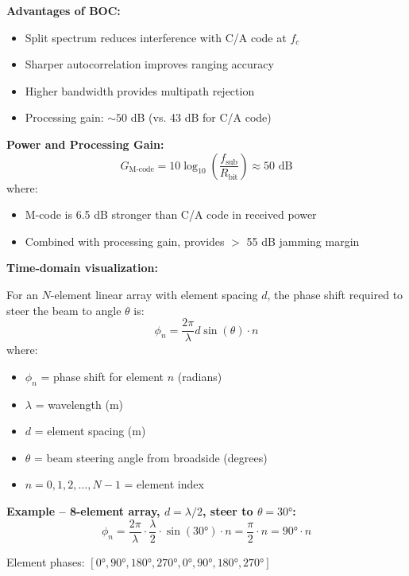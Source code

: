 \textbf{Advantages of BOC:}
\begin{itemize}
\item Split spectrum reduces interference with C/A code at $f_c$
\item Sharper autocorrelation improves ranging accuracy
\item Higher bandwidth provides multipath rejection
\item Processing gain: $\sim 50$ dB (vs. 43 dB for C/A code)
\end{itemize}

\textbf{Power and Processing Gain:}
\begin{equation}
G_{\text{M-code}} = 10\log_{10}\left(\frac{f_{\text{sub}}}{R_{\text{bit}}}\right) \approx 50 \text{ dB}
\end{equation}
where:
\begin{itemize}
\item M-code is 6.5 dB stronger than C/A code in received power
\item Combined with processing gain, provides $>$ 55 dB jamming margin
\end{itemize}

\textbf{Time-domain visualization:}

For an $N$-element linear array with element spacing $d$, the phase shift required to steer the beam to angle $\theta$ is:
\begin{equation}
\phi_n = \frac{2\pi}{\lambda} d \sin(\theta) \cdot n
\end{equation}
where:
\begin{itemize}
\item $\phi_n$ = phase shift for element $n$ (radians)
\item $\lambda$ = wavelength (m)
\item $d$ = element spacing (m)
\item $\theta$ = beam steering angle from broadside (degrees)
\item $n = 0, 1, 2, \ldots, N-1$ = element index
\end{itemize}

\textbf{Example -- 8-element array, $d = \lambda/2$, steer to $\theta = 30°$:}
\begin{equation}
\phi_n = \frac{2\pi}{\lambda} \cdot \frac{\lambda}{2} \cdot \sin(30°) \cdot n = \frac{\pi}{2} \cdot n = 90° \cdot n
\end{equation}

Element phases: $[0°, 90°, 180°, 270°, 0°, 90°, 180°, 270°]$

